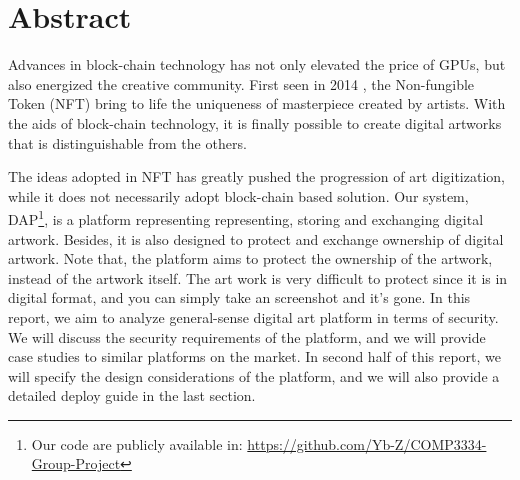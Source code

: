 \section*{Abstract}

Advances in block-chain technology has not only elevated the price of GPUs, but also energized the creative community. First seen in 2014 \cite{quantum}, the Non-fungible Token (NFT) bring to life the uniqueness of masterpiece created by artists. With the aids of block-chain technology, it is finally possible to create digital artworks that is distinguishable from the others. 


The ideas adopted in NFT has greatly pushed the progression of art digitization, while it does not necessarily adopt block-chain based solution. Our system, DAP\footnote{Our code are publicly available in: \url{https://github.com/Yb-Z/COMP3334-Group-Project}}, is a platform representing representing, storing and exchanging digital artwork. Besides, it is also designed to protect and exchange ownership of digital artwork. Note that, the platform aims to protect the ownership of the artwork, instead of the artwork itself. The art work is very difficult to protect since it is in digital format, and you can simply take an screenshot and it's gone. In this report, we aim to analyze general-sense digital art platform in terms of security. We will discuss the security requirements of the platform, and we will provide case studies to similar platforms on the market. In second half of this report, we will specify the design considerations of the platform, and we will also provide a detailed deploy guide in the last section.

